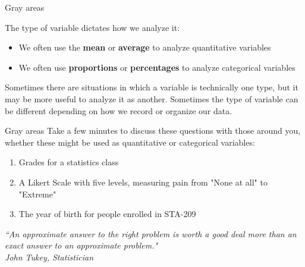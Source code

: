 \documentclass{beamer}
\begin{document}
\begin{frame}{Gray areas}

The type of variable dictates how we analyze it:
\begin{itemize}
\item We often use the \textbf{mean} or \textbf{average} to analyze quantitative variables
\item We often use \textbf{proportions} or \textbf{percentages} to analyze categorical variables
\end{itemize}

\vspace{4mm}

Sometimes there are situations in which a variable is technically one type, but it may be more useful to analyze it as another. Sometimes the type of variable can be different depending on how we record or organize our data. 

\end{frame}

\begin{frame}{Gray areas}
Take a few minutes to discuss these questions with those around you, whether these might be used as quantitative or categorical variables:

\begin{enumerate}
\item Grades for a statistics class
\item A Likert Scale with five levels, measuring pain from "None at all" to "Extreme"
\item The year of birth for people enrolled in STA-209
\end{enumerate}

\vspace{4mm}
\textit{``An approximate answer to the right problem is worth a good deal more than an exact answer to an approximate problem." \\ John Tukey, Statistician}

\end{frame}
\end{document}
